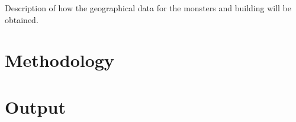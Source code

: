 Description of how the geographical data for the monsters and building will be obtained.

\section{Methodology}

\section{Output}
